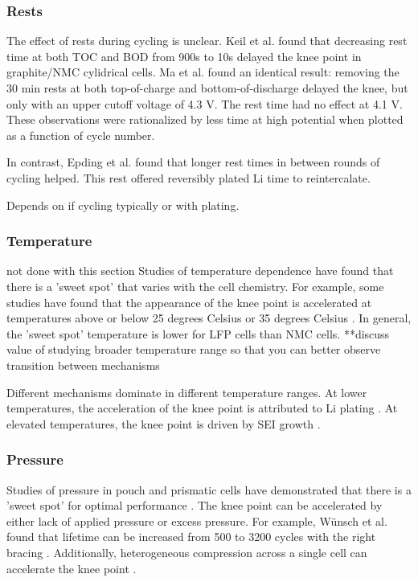 \documentclass{article}
\begin{document}
\subsubsection{Rests}

The effect of rests during cycling is unclear. 
Keil et al.\cite{keil_linear_2019} found that decreasing rest time at both TOC and BOD from 900s to 10s delayed the knee point in graphite/NMC cylidrical cells.
Ma et al.\cite{ma_editors_2019} found an identical result: removing the 30 min rests at both top-of-charge and bottom-of-discharge delayed the knee, but only with an upper cutoff voltage of 4.3 V. The rest time had no effect at 4.1 V.
These observations were rationalized by less time at high potential when plotted as a function of cycle number.

In contrast, Epding et al.\cite{epding_investigation_2019} found that longer rest times in between rounds of cycling helped. This rest offered reversibly plated Li time to reintercalate.

Depends on if cycling typically or with plating.

\subsubsection{Temperature} not done with this section
Studies of temperature dependence have found that there is a 'sweet spot' that varies with the cell chemistry. For example, some studies have found that the appearance of the knee point is accelerated at temperatures above or below 25 degrees Celsius \cite{zhang_accelerated_2019, waldmann_temperature_2014, waldmann_optimization_2015} or 35 degrees Celsius \cite{schuster_nonlinear_2015}. In general, the 'sweet spot' temperature is lower for LFP cells than NMC cells. **discuss value of studying broader temperature range so that you can better observe transition between mechanisms

Different mechanisms dominate in different temperature ranges. At lower temperatures, the acceleration of the knee point is attributed to Li plating \cite {zhang_accelerated_2019,schuster_nonlinear_2015,waldmann_temperature_2014,waldmann_optimization_2015}. At elevated temperatures, the knee point is driven by SEI growth \cite{}. 

\subsubsection{Pressure}
Studies of pressure in pouch and prismatic cells have demonstrated that there is a 'sweet spot' for optimal performance \cite{cannarella_stress_2014, wunsch_investigation_2019}. The knee point can be accelerated by either lack of applied pressure or excess pressure. For example, Wünsch et al. found that lifetime can be increased from 500 to 3200 cycles with the right bracing \cite{wunsch_investigation_2019}. Additionally, heterogeneous compression across a single cell can accelerate the knee point \cite{bach_nonlinear_2016}. 
\end{document}
